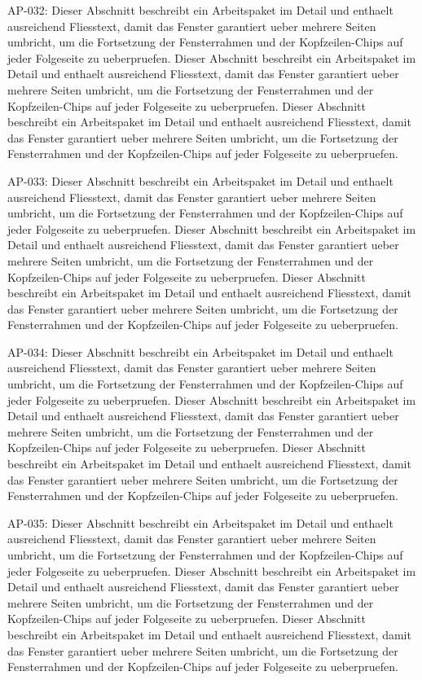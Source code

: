 \documentclass[type=report,theme=light,language=de]{semio}
\begin{document}
\begin{Table}[title=Lange Tabelle]
AP-032: Dieser Abschnitt beschreibt ein Arbeitspaket im Detail und enthaelt ausreichend Fliesstext, damit das Fenster garantiert ueber mehrere Seiten umbricht, um die Fortsetzung der Fensterrahmen und der Kopfzeilen-Chips auf jeder Folgeseite zu ueberpruefen. Dieser Abschnitt beschreibt ein Arbeitspaket im Detail und enthaelt ausreichend Fliesstext, damit das Fenster garantiert ueber mehrere Seiten umbricht, um die Fortsetzung der Fensterrahmen und der Kopfzeilen-Chips auf jeder Folgeseite zu ueberpruefen. Dieser Abschnitt beschreibt ein Arbeitspaket im Detail und enthaelt ausreichend Fliesstext, damit das Fenster garantiert ueber mehrere Seiten umbricht, um die Fortsetzung der Fensterrahmen und der Kopfzeilen-Chips auf jeder Folgeseite zu ueberpruefen. 

AP-033: Dieser Abschnitt beschreibt ein Arbeitspaket im Detail und enthaelt ausreichend Fliesstext, damit das Fenster garantiert ueber mehrere Seiten umbricht, um die Fortsetzung der Fensterrahmen und der Kopfzeilen-Chips auf jeder Folgeseite zu ueberpruefen. Dieser Abschnitt beschreibt ein Arbeitspaket im Detail und enthaelt ausreichend Fliesstext, damit das Fenster garantiert ueber mehrere Seiten umbricht, um die Fortsetzung der Fensterrahmen und der Kopfzeilen-Chips auf jeder Folgeseite zu ueberpruefen. Dieser Abschnitt beschreibt ein Arbeitspaket im Detail und enthaelt ausreichend Fliesstext, damit das Fenster garantiert ueber mehrere Seiten umbricht, um die Fortsetzung der Fensterrahmen und der Kopfzeilen-Chips auf jeder Folgeseite zu ueberpruefen. 

AP-034: Dieser Abschnitt beschreibt ein Arbeitspaket im Detail und enthaelt ausreichend Fliesstext, damit das Fenster garantiert ueber mehrere Seiten umbricht, um die Fortsetzung der Fensterrahmen und der Kopfzeilen-Chips auf jeder Folgeseite zu ueberpruefen. Dieser Abschnitt beschreibt ein Arbeitspaket im Detail und enthaelt ausreichend Fliesstext, damit das Fenster garantiert ueber mehrere Seiten umbricht, um die Fortsetzung der Fensterrahmen und der Kopfzeilen-Chips auf jeder Folgeseite zu ueberpruefen. Dieser Abschnitt beschreibt ein Arbeitspaket im Detail und enthaelt ausreichend Fliesstext, damit das Fenster garantiert ueber mehrere Seiten umbricht, um die Fortsetzung der Fensterrahmen und der Kopfzeilen-Chips auf jeder Folgeseite zu ueberpruefen. 

AP-035: Dieser Abschnitt beschreibt ein Arbeitspaket im Detail und enthaelt ausreichend Fliesstext, damit das Fenster garantiert ueber mehrere Seiten umbricht, um die Fortsetzung der Fensterrahmen und der Kopfzeilen-Chips auf jeder Folgeseite zu ueberpruefen. Dieser Abschnitt beschreibt ein Arbeitspaket im Detail und enthaelt ausreichend Fliesstext, damit das Fenster garantiert ueber mehrere Seiten umbricht, um die Fortsetzung der Fensterrahmen und der Kopfzeilen-Chips auf jeder Folgeseite zu ueberpruefen. Dieser Abschnitt beschreibt ein Arbeitspaket im Detail und enthaelt ausreichend Fliesstext, damit das Fenster garantiert ueber mehrere Seiten umbricht, um die Fortsetzung der Fensterrahmen und der Kopfzeilen-Chips auf jeder Folgeseite zu ueberpruefen. 


\end{Table}
\end{document}
